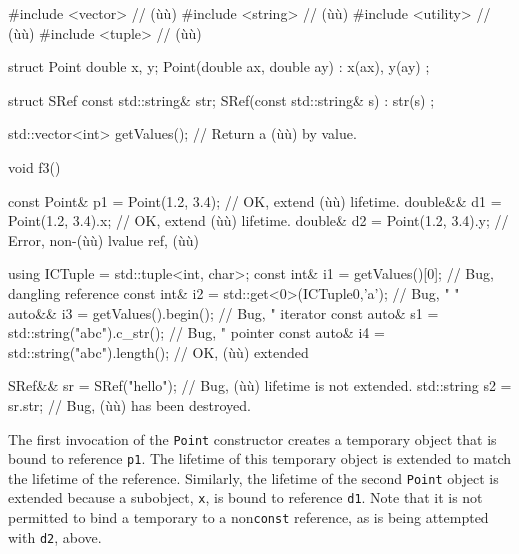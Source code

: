 {{{\begin{emcppslisting}[emcppsbatch=e4]
#include <vector>   // (ù{}ù)
#include <string>   // (ù{}ù)
#include <utility>  // (ù{}ù)
#include <tuple>    // (ù{}ù)

struct Point
{
    double x, y;
    Point(double ax, double ay) : x(ax), y(ay) { }
};

struct SRef
{
    const std::string& str;
    SRef(const std::string& s) : str(s) { }
};

std::vector<int> getValues();  // Return a (ù{}ù) by value.

void f3()
{
    const Point& p1 = Point(1.2, 3.4);    // OK, extend (ù{}ù) lifetime.
    double&&     d1 = Point(1.2, 3.4).x;  // OK, extend (ù{}ù) lifetime.
    double&      d2 = Point(1.2, 3.4).y;  // Error, non-(ù{}ù) lvalue ref, (ù{}ù)

    using ICTuple = std::tuple<int, char>;
    const int&  i1 = getValues()[0];               // Bug, dangling reference
    const int&  i2 = std::get<0>(ICTuple{0,'a'});  // Bug,     "        "
    auto&&      i3 = getValues().begin();          // Bug,     "    iterator
    const auto& s1 = std::string("abc").c_str();   // Bug,     "    pointer
    const auto& i4 = std::string("abc").length();  // OK, (ù{}ù) extended

    SRef&&      sr = SRef("hello");  // Bug, (ù{}ù) lifetime is not extended.
    std::string s2 = sr.str;         // Bug, (ù{}ù) has been destroyed.
}
\end{emcppslisting}
    

\noindent The first invocation of the \lstinline!Point! constructor creates a
temporary object that is bound to reference \lstinline!p1!. The lifetime of
this temporary object is extended to match the lifetime of the
reference. Similarly, the lifetime of the second \lstinline!Point! object
is extended because a subobject, \lstinline!x!, is bound to reference
\lstinline!d1!. Note that it is not permitted to bind a temporary to a
non\lstinline!const!  reference, as is being attempted with
\lstinline!d2!, above.

}}}
